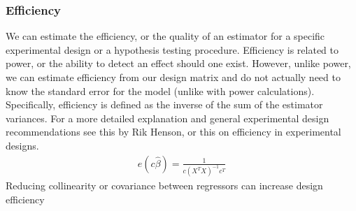 \documentclass[letterpaper,10pt,english]{sphinxmanual}
\begin{document}
\subsubsection{Efficiency}
\label{\detokenize{content/GLM:efficiency}}
We can estimate the efficiency, or the quality of an estimator for a specific experimental design or a hypothesis testing procedure. Efficiency is related to power, or the ability to detect an effect should one exist. However, unlike power, we can estimate efficiency from our design matrix and do not actually need to know the standard error for the model (unlike with power calculations). Specifically, efficiency is defined as the inverse of the sum of the estimator variances. For a more detailed explanation and general experimental design recommendations see this  by Rik Henson, or this  on efficiency in experimental designs.
\begin{equation*}
\begin{split}e(c\hat\beta) = \frac{1}{c(X^TX)^{-1}c^T}\end{split}
\end{equation*}
Reducing collinearity or covariance between regressors can increase design efficiency

\begin{sphinxVerbatim}[commandchars=\\\{\}]
  
      
        

  \PYG{p}{[}  \PYG{p}{]}
  \PYG{p}{[}  \PYG{p}{]}
  \PYG{p}{[}  \PYG{p}{]}

\PYG{p}{[}     \PYG{p}{[}  \PYG{p}{]}\PYG{p}{]}
\end{sphinxVerbatim}
\end{document}
